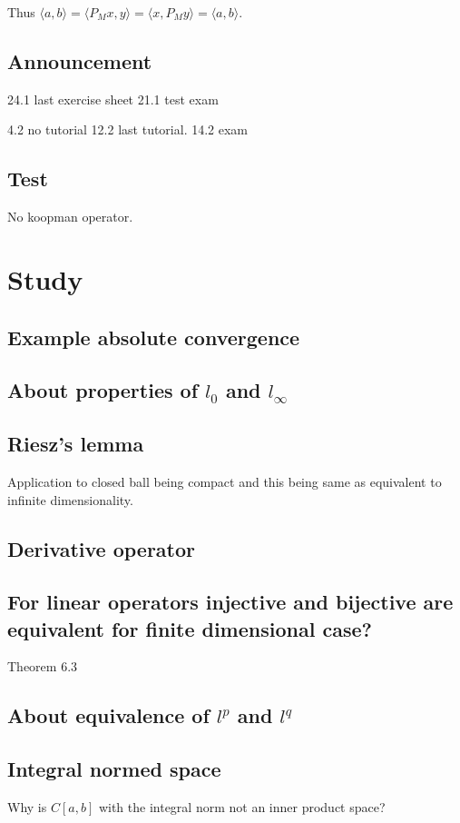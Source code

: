 \documentclass[11pt]{article}
\begin{document}
Thus \(\langle a, b \rangle = \langle P_M x, y \rangle = \langle x, P_M y
    \rangle = \langle a, b\rangle\).
\subsection{Announcement}
\label{sec:org6c9dfe2}
24.1 last exercise sheet
21.1 test exam

4.2 no tutorial
12.2 last tutorial.
14.2 exam
\subsection{Test}
\label{sec:org887f3df}
No koopman operator.
\section{Study}
\label{sec:org69a84b9}
\subsection{Example absolute convergence}
\label{sec:orgd121c29}
\subsection{About properties of \(l_0\) and \(l_\infty\)}
\label{sec:orgc102df2}
\subsection{Riesz's lemma}
\label{sec:orgdd461cb}
Application to closed ball being compact and this being same as equivalent to
infinite dimensionality.
\subsection{Derivative operator}
\label{sec:orgd699844}
\subsection{For linear operators injective and bijective are equivalent for finite dimensional case?}
\label{sec:orgdaeba7a}
Theorem 6.3
\subsection{About equivalence of \(l^p\) and \(l^q\)}
\label{sec:org3bd746f}
\subsection{Integral normed space}
\label{sec:org19b87b4}
Why is \(C[a, b]\) with the integral norm not an inner product space?
\end{document}
